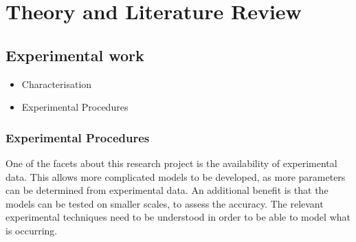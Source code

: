 \chapter{Theory and Literature Review}

\section{Experimental work}
\begin{itemize}
\item Characterisation
\item Experimental Procedures 
\end{itemize}
\subsection{Experimental Procedures}
One of the facets about this research project is the availability of experimental data. This allows more complicated models to be developed, as more parameters can be determined from experimental data. An additional benefit is that the models can be tested on smaller scales, to assess the accuracy. The relevant experimental techniques need to be understood in order to be able to model what is occurring.

